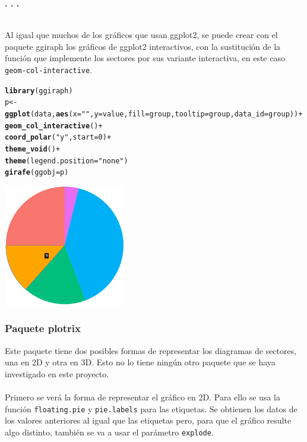 \documentclass{article}\usepackage[]{graphicx}\usepackage[]{color}
\makeatletter
\newcommand{\hlnum}[1]{\textcolor[rgb]{0.686,0.059,0.569}{#1}}%
\newcommand{\hlstr}[1]{\textcolor[rgb]{0.192,0.494,0.8}{#1}}%
\newcommand{\hlopt}[1]{\textcolor[rgb]{0,0,0}{#1}}%
\newcommand{\hlstd}[1]{\textcolor[rgb]{0.345,0.345,0.345}{#1}}%
\newcommand{\hlkwb}[1]{\textcolor[rgb]{0.69,0.353,0.396}{#1}}%
\newcommand{\hlkwc}[1]{\textcolor[rgb]{0.333,0.667,0.333}{#1}}%
\newcommand{\hlkwd}[1]{\textcolor[rgb]{0.737,0.353,0.396}{\textbf{#1}}}%
\newenvironment{kframe}{%
 \def\at@end@of@kframe{}%
 \ifinner\ifhmode%
  \def\at@end@of@kframe{\end{minipage}}%
  \begin{minipage}{\columnwidth}%
 \fi\fi%
 \def\FrameCommand##1{\hskip\@totalleftmargin \hskip-\fboxsep
 \colorbox{shadecolor}{##1}\hskip-\fboxsep
     \hskip-\linewidth \hskip-\@totalleftmargin \hskip\columnwidth}%
 \MakeFramed {\advance\hsize-\width
   \@totalleftmargin\z@ \linewidth\hsize
   \@setminipage}}%
 {\par\unskip\endMakeFramed%
 \at@end@of@kframe}
\newenvironment{knitrout}{}{} %
\makeatother
\begin{document}
\begin{center}
\textbf{. . .}
\end{center}
~\\
Al igual que muchos de los gr\'aficos que usan ggplot2, se puede crear con el paquete ggiraph \cite{docu_ggiraph}
los gr\'aficos de ggplot2 interactivos, con la sustituci\'on de la funci\'on que implemente los sectores por sus variante interactiva, en este caso \texttt{geom-col-interactive}.
\begin{knitrout}
\color{fgcolor}\begin{kframe}
\begin{alltt}
\hlkwd{library}\hlstd{(ggiraph)}
\hlstd{p} \hlkwb{<-} \hlkwd{ggplot}\hlstd{(data,} \hlkwd{aes}\hlstd{(}\hlkwc{x}\hlstd{=}\hlstr{""}\hlstd{,} \hlkwc{y}\hlstd{=value,} \hlkwc{fill}\hlstd{=group,} \hlkwc{tooltip} \hlstd{= group,} \hlkwc{data_id} \hlstd{= group))} \hlopt{+}
  \hlkwd{geom_col_interactive}\hlstd{()} \hlopt{+}
  \hlkwd{coord_polar}\hlstd{(}\hlstr{"y"}\hlstd{,} \hlkwc{start}\hlstd{=}\hlnum{0}\hlstd{)} \hlopt{+}
  \hlkwd{theme_void}\hlstd{()} \hlopt{+}
  \hlkwd{theme}\hlstd{(}\hlkwc{legend.position} \hlstd{=} \hlstr{"none"}\hlstd{)}
\hlkwd{girafe}\hlstd{(}\hlkwc{ggobj} \hlstd{= p)}
\end{alltt}
\end{kframe}
\end{knitrout}
\vbox{
    \centering
    \includegraphics[width=0.4\textwidth]{imag/pie_ggplot2}
}
\clearpage
\subsubsection{Paquete plotrix}
Este paquete \cite{docu_plotrix} 
tiene dos posibles formas de representar los diagramas de sectores, una en 2D y otra en 3D. Esto no lo tiene ning\'un otro paquete que se haya investigado en este proyecto.~\\~\\
Primero se ver\'a la forma de representar el gr\'afico en 2D. Para ello se usa la funci\'on \texttt{floating.pie} y \texttt{pie.labels} para las etiquetas. Se obtienen los datos de los valores anteriores al igual que las etiquetas pero, para que el gr\'afico resulte algo distinto, tambi\'en se va a usar el par\'ametro \texttt{explode}.
\end{document}
